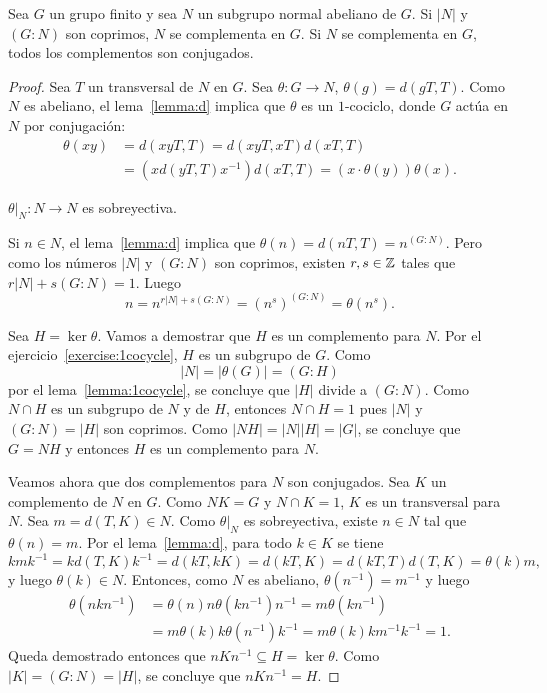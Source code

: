 \begin{theorem}
	\label{theorem:SchurZassenhaus:abeliano}
	Sea $G$ un grupo finito y sea $N$ un subgrupo normal abeliano de $G$. Si
	$|N|$ y $(G:N)$ son coprimos, $N$ se complementa en $G$. Si $N$ se
	complementa en $G$, todos los complementos son conjugados.  
\end{theorem}

\begin{proof}
	Sea $T$ un transversal de $N$ en $G$. Sea $\theta\colon G\to N$,
	$\theta(g)=d(gT,T)$. Como $N$ es abeliano, el lema~\ref{lemma:d} implica
	que $\theta$ es un $1$-cociclo, donde $G$ actúa en $N$ por conjugación:
	\begin{align*}
		\theta(xy)&=d(xyT,T)
		=d(xyT,xT)d(xT,T)\\
		&=(xd(yT,T)x^{-1})d(xT,T)=(x\cdot\theta(y))\theta(x).
	\end{align*}

	\begin{claim}
		$\theta|_N\colon N\to N$ es sobreyectiva.
	\end{claim}

	Si $n\in N$, el lema~\ref{lemma:d} implica que
	$\theta(n)=d(nT,T)=n^{(G:N)}$. Pero como los números $|N|$ y $(G:N)$ son
	coprimos, existen $r,s\in\mathbb{Z}$ tales que $r|N|+s(G:N)=1$. Luego
	\[
		n=n^{r|N|+s(G:N)}=(n^s)^{(G:N)}=\theta(n^s).
	\]

	Sea $H=\ker\theta$. Vamos a demostrar que $H$ es un complemento para $N$. 
	Por el ejercicio~\ref{exercise:1cocycle}, $H$ es un
	subgrupo de $G$. Como
	\[
		|N|=|\theta(G)|=(G:H)
	\]
	por el lema~\ref{lemma:1cocycle}, se concluye que $|H|$ divide a $(G:N)$.
	Como $N\cap H$ es un subgrupo de $N$ y de $H$, entonces $N\cap H=1$ pues
	$|N|$ y $(G:N)=|H|$ son coprimos.  Como $|NH|=|N||H|=|G|$, se concluye que
	$G=NH$ y entonces $H$ es un complemento para $N$.

	Veamos ahora que dos complementos para $N$ son conjugados. 
	Sea $K$ un complemento de $N$ en $G$. Como $NK=G$ y $N\cap K=1$, $K$ es un
	transversal para $N$. Sea $m=d(T,K)\in N$. Como $\theta|_N$ es
	sobreyectiva, existe $n\in N$ tal que $\theta(n)=m$. Por el
	lema~\ref{lemma:d}, para todo $k\in K$ se tiene
	\[
	kmk^{-1}=kd(T,K)k^{-1}=d(kT,kK)=d(kT,K)=d(kT,T)d(T,K)=\theta(k)m,
	\]
	y luego $\theta(k)\in N$. Entonces, como $N$ es abeliano,
	$\theta(n^{-1})=m^{-1}$ y luego 
	\begin{align*}
		\theta(nkn^{-1})&=\theta(n)n\theta(kn^{-1})n^{-1}
		=m\theta(kn^{-1})\\
		&=m\theta(k)k\theta(n^{-1})k^{-1}
		=m\theta(k)km^{-1}k^{-1}=1.
	\end{align*}
	Queda demostrado entonces que $nKn^{-1}\subseteq H=\ker\theta$. Como
	$|K|=(G:N)=|H|$, se concluye que $nKn^{-1}=H$.
\end{proof}

